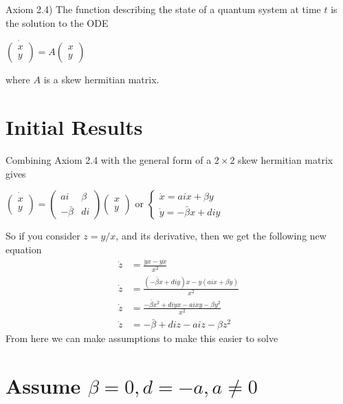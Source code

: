 \documentclass[10pt]{article}
\begin{document}
Axiom 2.4) The function describing the state of a quantum system at time $t$ is the solution to the ODE
\begin{center}$
\dot{\begin{pmatrix}x\\y\end{pmatrix}}=A\begin{pmatrix}x\\y\end{pmatrix}
$\end{center}
where $A$ is a skew hermitian matrix.

\section{Initial Results}
Combining Axiom 2.4 with the general form of a $2\times2$ skew hermitian matrix gives
\begin{center}
$\dot{\begin{pmatrix}x\\y\end{pmatrix}}=\begin{pmatrix}ai&\beta\\-\bar\beta&di\end{pmatrix}\begin{pmatrix}x\\y\end{pmatrix}$
or $\begin{cases}\dot x=aix+\beta y\\\dot y=-\bar\beta x+diy\end{cases}$
\end{center}
So if you consider $z=y/x$, and its derivative, then we get the following new equation
\begin{align*}
\dot z&=\frac{\dot yx-y\dot x}{x^2}\\
\dot z&=\frac{(-\bar\beta x+diy)x-y(aix+\beta y)}{x^2}\\
\dot z&=\frac{-\bar\beta x^2+diyx-aixy-\beta y^2}{x^2}\\
\dot z&=-\bar\beta+diz-aiz-\beta z^2
\end{align*}
From here we can make assumptions to make this easier to solve

\section{Assume $\beta=0, d=-a, a\neq0$}
\end{document}

